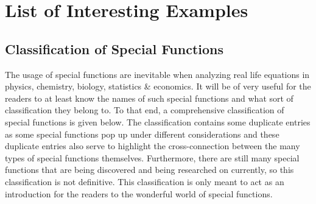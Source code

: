 \chapter{List of Interesting Examples}
\section{Classification of Special Functions}
The usage of special functions are inevitable when analyzing real life equations in physics, chemistry, biology, statistics \& economics. It will be of very useful for the readers to at least know the names of such special functions and what sort of classification they belong to. To that end, a comprehensive classification of special functions is given below. The classification contains some duplicate entries as some special functions pop up under different considerations and these duplicate entries also serve to highlight the cross-connection between the many types of special functions themselves. Furthermore, there are still many special functions that are being discovered and being researched on currently, so this classification is not definitive. This classification is only meant to act as an introduction for the readers to the wonderful world of special functions.
